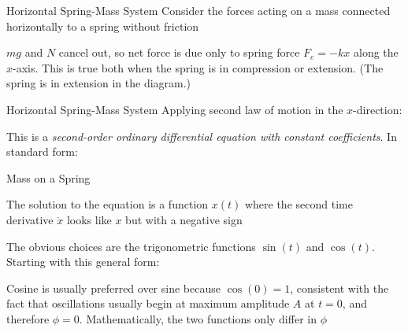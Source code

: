 \documentclass[12pt,compress,aspectratio=169]{beamer}
\begin{document}
\begin{frame}{Horizontal Spring-Mass System}
  Consider the forces acting on a mass connected horizontally to a spring
  without friction
  \begin{center}
  \end{center}
  $mg$ and $N$ cancel out, so net force is due only to spring force
  $F_e=-kx$ along the $x$-axis. This is true both when the spring is
  in compression or extension. (The spring is in extension in the diagram.)
\end{frame}



\begin{frame}{Horizontal Spring-Mass System}
  Applying second law of motion in the $x$-direction:


  This is a
  \emph{second-order ordinary differential equation with constant
    coefficients}. In standard form:

  

\end{frame}



\begin{frame}{Mass on a Spring}

  The solution to the equation is a function $x(t)$ where the second time
  derivative $\ddot x$ looks like $x$ but with a negative sign


  The obvious choices are the trigonometric functions $\sin(t)$ and $\cos(t)$.
  Starting with this general form:
    
  
  Cosine is usually preferred over sine because $\cos(0)=1$, consistent with
  the fact that oscillations usually begin at maximum amplitude $A$ at $t=0$,
  and therefore $\phi=0$. Mathematically, the two functions only differ in
  $\phi$
\end{frame}
\end{document}
